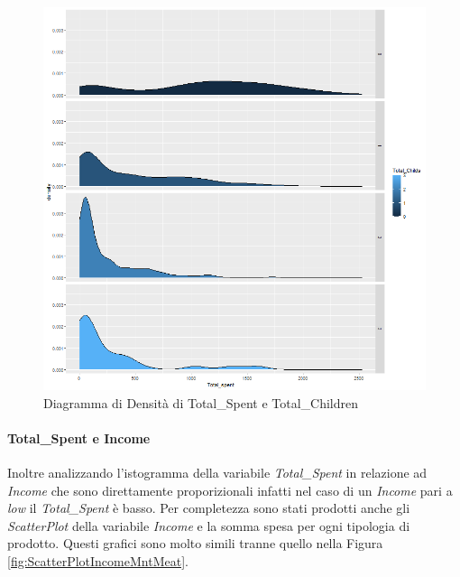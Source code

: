\documentclass[letterpaper,11pt]{article}
\begin{document}
\begin{figure}[h]
\begin{minipage}[b]{0.4\textwidth}
    \includegraphics[width=\textwidth]{Img/EDA/EDA031.png}
    \caption{Diagramma di Densità di Total\_Spent e Total\_Children}
    \label{fig:DensitaTsTc}
  \end{minipage}
\end{figure}

\paragraph{Total\_Spent e Income}
Inoltre analizzando l'istogramma della variabile \textit{Total\_Spent} in relazione ad \textit{Income} che sono direttamente proporizionali infatti nel caso di un \textit{Income} pari a \textit{low} il \textit{Total\_Spent} è basso. 
Per completezza sono stati prodotti anche gli \textit{ScatterPlot} della variabile \textit{Income} e la somma spesa per ogni tipologia di prodotto. Questi grafici sono molto simili tranne quello nella Figura \ref{fig:ScatterPlotIncomeMntMeat}.
\end{document}

